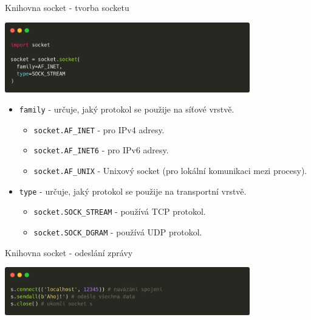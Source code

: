 \documentclass{beamer}
\begin{document}
\begin{frame}{Knihovna socket - tvorba socketu}
    \begin{center}
        \includegraphics[width=0.8\textwidth]{obrazky/codes/carbon10.png}
    \end{center}
	\begin{itemize}
		\item \texttt{family}  - určuje, jaký protokol se použije na síťové vrstvě.
		\begin{itemize}
			\item \texttt{socket.AF\_INET} - pro IPv4 adresy.
			\item \texttt{socket.AF\_INET6} - pro IPv6 adresy.
			\item \texttt{socket.AF\_UNIX} - Unixový socket (pro lokální komunikaci mezi procesy).
		\end{itemize}
		\item \texttt{type} - určuje, jaký protokol se použije na transportní vrstvě.
		\begin{itemize}
			\item \texttt{socket.SOCK\_STREAM} - používá TCP protokol.
			\item \texttt{socket.SOCK\_DGRAM} - používá UDP protokol.
		\end{itemize}
	\end{itemize}
\end{frame}

\begin{frame}{Knihovna socket - odeslání zprávy}
    \begin{center}
        \includegraphics[width=0.8\textwidth]{obrazky/codes/carbon11.png}
    \end{center}
\end{frame}
\end{document}
